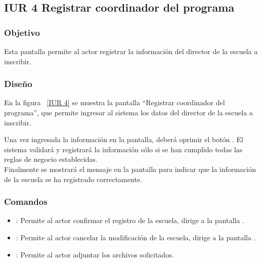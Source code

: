 \subsection{IUR 4 Registrar coordinador del programa}

\subsubsection{Objetivo}
	
    Esta pantalla permite al actor  registrar la información del director de la escuela a inscribir.

\subsubsection{Diseño}

    En la figura ~\ref{IUR 4} se muestra la pantalla ``Registrar coordinador del programa'', que permite ingresar al sistema los datos del director de la escuela a inscribir.
    
    Una vez ingresada la información en la pantalla, deberá oprimir el botón . El sistema validará y registrará la información sólo si se han cumplido todas las reglas de negocio establecidas.  \\
    
    Finalmente se mostrará el mensaje  en 
    la pantalla  para indicar que la información de la escuela
    se ha registrado correctamente. 
    

     
\subsubsection{Comandos}
    \begin{itemize}
	\item {}: Permite al actor confirmar el registro de la escuela, dirige a la pantalla .
	\item {}: Permite al actor cancelar la modificación de la escuela, dirige a la pantalla .
	\item \botAddClip[Adjuntar]: Permite al actor adjuntar los archivos solicitados.
    \end{itemize}

